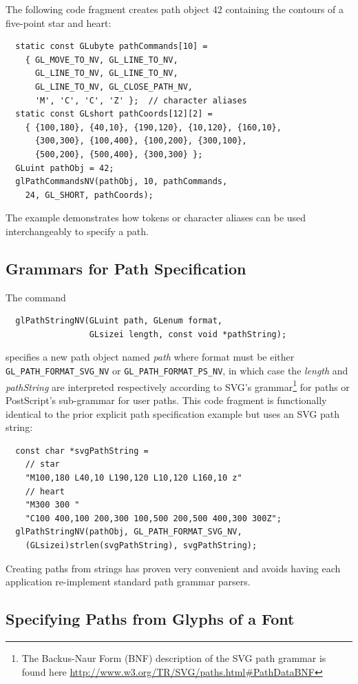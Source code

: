 The following code fragment creates path object 42 containing the contours
of a five-point star and heart:
\begin{lstlisting}
  static const GLubyte pathCommands[10] =
    { GL_MOVE_TO_NV, GL_LINE_TO_NV,
      GL_LINE_TO_NV, GL_LINE_TO_NV,
      GL_LINE_TO_NV, GL_CLOSE_PATH_NV,
      'M', 'C', 'C', 'Z' };  // character aliases
  static const GLshort pathCoords[12][2] =
    { {100,180}, {40,10}, {190,120}, {10,120}, {160,10},
      {300,300}, {100,400}, {100,200}, {300,100},
      {500,200}, {500,400}, {300,300} };
  GLuint pathObj = 42;
  glPathCommandsNV(pathObj, 10, pathCommands,
    24, GL_SHORT, pathCoords);
\end{lstlisting}
The example demonstrates how tokens or character aliases can be used
interchangeably to specify a path.

\subsection{Grammars for Path Specification}

The command 
\begin{lstlisting}
  glPathStringNV(GLuint path, GLenum format,
                 GLsizei length, const void *pathString);
\end{lstlisting}
specifies a new path object named {\em path} where format must be either
{\tt GL\_PATH\_FORMAT\_SVG\_NV} or {\tt GL\_PATH\_FORMAT\_PS\_NV}, in which case the
{\em length} and {\em pathString} are interpreted respectively according to
SVG's grammar\footnote{The Backus-Naur Form (BNF) description of the SVG path grammar is found here \url{http://www.w3.org/TR/SVG/paths.html\#PathDataBNF}}
for paths or PostScript's sub-grammar for user paths.
This code fragment is functionally identical to the prior explicit path
specification example but uses an SVG path string:
\begin{lstlisting}
  const char *svgPathString =
    // star
    "M100,180 L40,10 L190,120 L10,120 L160,10 z"
    // heart
    "M300 300 "
    "C100 400,100 200,300 100,500 200,500 400,300 300Z";
  glPathStringNV(pathObj, GL_PATH_FORMAT_SVG_NV,
    (GLsizei)strlen(svgPathString), svgPathString);
\end{lstlisting}
Creating paths from strings has proven very convenient and avoids having
each application re-implement standard path grammar parsers.

\subsection{Specifying Paths from Glyphs of a Font}


